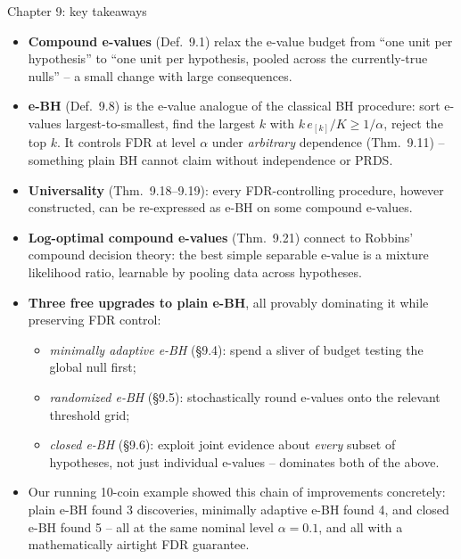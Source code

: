 \documentclass[aspectratio=169,10pt]{beamer}
\begin{document}
\begin{frame}[allowframebreaks]{Chapter 9: key takeaways}

\begin{itemize}
\item \textbf{Compound e-values} (Def.\ 9.1) relax the e-value budget from ``one unit per hypothesis'' to ``one unit per hypothesis, pooled across the currently-true nulls'' -- a small change with large consequences.
\item \textbf{e-BH} (Def.\ 9.8) is the e-value analogue of the classical BH procedure: sort e-values largest-to-smallest, find the largest $k$ with $k\,e_{[k]}/K \ge 1/\alpha$, reject the top $k$. It controls FDR at level $\alpha$ under \emph{arbitrary} dependence (Thm.\ 9.11) -- something plain BH cannot claim without independence or PRDS.
\item \textbf{Universality} (Thm.\ 9.18--9.19): every FDR-controlling procedure, however constructed, can be re-expressed as e-BH on some compound e-values.
\item \textbf{Log-optimal compound e-values} (Thm.\ 9.21) connect to Robbins' compound decision theory: the best simple separable e-value is a mixture likelihood ratio, learnable by pooling data across hypotheses.
\item \textbf{Three free upgrades to plain e-BH}, all provably dominating it while preserving FDR control:
\begin{itemize}
\item \emph{minimally adaptive e-BH} (\S9.4): spend a sliver of budget testing the global null first;
\item \emph{randomized e-BH} (\S9.5): stochastically round e-values onto the relevant threshold grid;
\item \emph{closed e-BH} (\S9.6): exploit joint evidence about \emph{every} subset of hypotheses, not just individual e-values -- dominates both of the above.
\end{itemize}
\item Our running 10-coin example showed this chain of improvements concretely: plain e-BH found 3 discoveries, minimally adaptive e-BH found 4, and closed e-BH found 5 -- all at the same nominal level $\alpha=0.1$, and all with a mathematically airtight FDR guarantee.
\end{itemize}

\end{frame}
\end{document}
